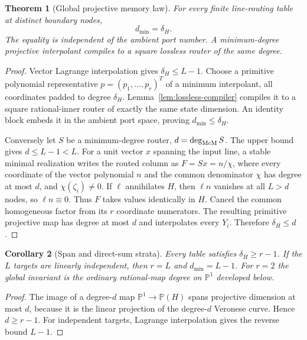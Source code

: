 \documentclass[11pt]{article}
\newtheorem{theorem}{Theorem}[section]
\newtheorem{corollary}[theorem]{Corollary}
\theoremstyle{definition}\newtheorem{definition}[theorem]{Definition}\newtheorem{example}[theorem]{Example}
\theoremstyle{remark}\newtheorem{remark}[theorem]{Remark}\newtheorem{limitation}[theorem]{Limitation}
\newcommand{\PP}{\mathbb P}\newcommand{\rank}{\operatorname{rank}}
\begin{document}
\begin{theorem}[Global projective memory law]\label{thm:global}
For every finite line-routing table at distinct boundary nodes,
\begin{equation}\label{eq:global}
                         \boxed{d_{\min}=\delta_H.}
\end{equation}
The equality is independent of the ambient port number.  A minimum-degree
projective interpolant compiles to a square lossless router of the same degree.
\end{theorem}

\begin{proof}
Vector Lagrange interpolation gives $\delta_H\le L-1$.  Choose a primitive
polynomial representative $p=(p_1,\ldots,p_r)^T$ of a minimum interpolant,
all coordinates padded to degree $\delta_H$.  Lemma~\ref{lem:lossless-compiler}
compiles it to a square rational-inner router of exactly the same state
dimension.  An identity block embeds it in the ambient port space, proving
$d_{\min}\le\delta_H$.

Conversely let $S$ be a minimum-degree router, $d=\deg_{\mathrm{McM}} S$.  The upper bound
gives $d\le L-1<L$.  For a unit vector $x$ spanning the input line, a stable
minimal realization writes the routed column as $F=Sx=n/\chi$, where every
coordinate of the vector polynomial $n$ and the common denominator $\chi$ has
degree at most $d$, and $\chi(\zeta_i)\ne0$.  If $\ell$ annihilates $H$, then
$\ell n$ vanishes at all $L>d$ nodes, so $\ell n\equiv0$.  Thus $F$ takes
values identically in $H$.  Cancel the common homogeneous factor from its $r$
coordinate numerators.  The resulting primitive projective map has degree at
most $d$ and interpolates every $Y_i$.  Therefore $\delta_H\le d$.
\end{proof}

\begin{corollary}[Span and direct-sum strata]\label{cor:global-strata}
Every table satisfies $\delta_H\ge r-1$.  If the $L$ targets are linearly
independent, then $r=L$ and $d_{\min}=L-1$.  For $r=2$ the global invariant is
the ordinary rational-map degree on $\PP^1$ developed below.
\end{corollary}

\begin{proof}
The image of a degree-$d$ map $\PP^1\to\PP(H)$ spans projective dimension at
most $d$, because it is the linear projection of the degree-$d$ Veronese
curve.  Hence $d\ge r-1$.  For independent targets, Lagrange interpolation
gives the reverse bound $L-1$.
\end{proof}
\end{document}
